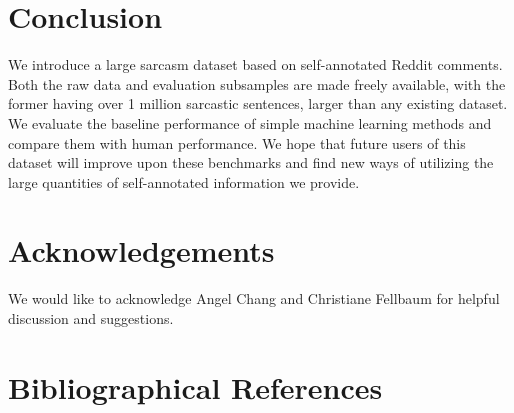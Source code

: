 \documentclass[10pt, a4paper]{article}
\begin{document}
\section{Conclusion}
\label{sec:conclusion}

We introduce a large sarcasm dataset based on self-annotated Reddit comments.
Both the raw data and evaluation subsamples are made freely available, with the former having over 1 million sarcastic sentences, larger than any existing dataset.
We evaluate the baseline performance of simple machine learning methods and compare them with human performance.
We hope that future users of this dataset will improve upon these benchmarks and find new ways of utilizing the large quantities of self-annotated information we provide.

\section{Acknowledgements}
We would like to acknowledge Angel Chang and Christiane Fellbaum for helpful discussion and suggestions. 
\section{Bibliographical References}


\end{document}
